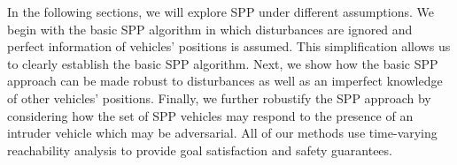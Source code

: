 In the following sections, we will explore SPP under different assumptions. We begin with the basic SPP algorithm in which disturbances are ignored and perfect information of vehicles' positions is assumed. This simplification allows us to clearly establish the basic SPP algorithm. Next, we show how the basic SPP approach can be made robust to disturbances as well as an imperfect knowledge of other vehicles' positions. Finally, we further robustify the SPP approach by considering how the set of SPP vehicles may respond to the presence of an intruder vehicle which may be adversarial. All of our methods use time-varying reachability analysis to provide goal satisfaction and safety guarantees.